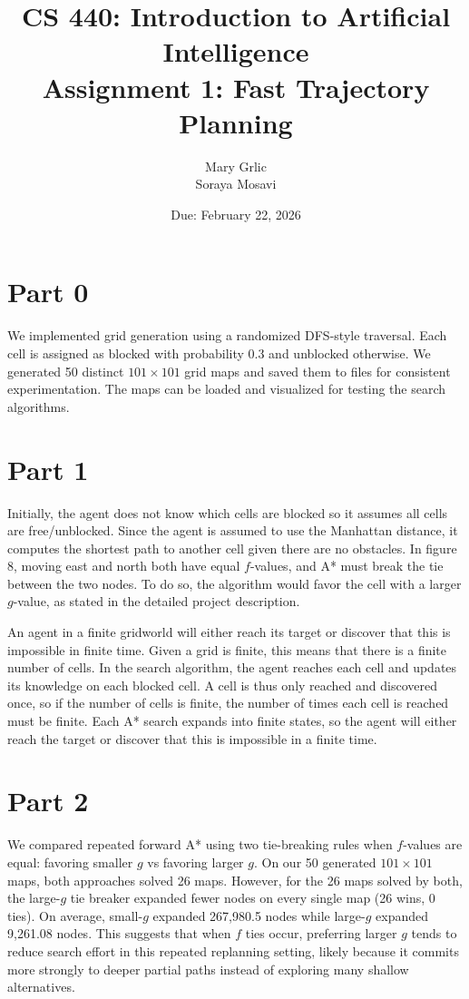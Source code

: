 \documentclass[11pt]{article}
\title{CS 440: Introduction to Artificial Intelligence\\
Assignment 1: Fast Trajectory Planning}
\author{Mary Grlic \\
Soraya Mosavi}
\date{Due: February 22, 2026}
\begin{document}
\maketitle
\newpage

\section*{Part 0}

We implemented grid generation using a randomized DFS-style traversal. Each cell is assigned as blocked with probability 0.3 and unblocked otherwise. We generated 50 distinct $101 \times 101$ grid maps and saved them to files for consistent experimentation. The maps can be loaded and visualized for testing the search algorithms.

\section*{Part 1}

Initially, the agent does not know which cells are blocked so it assumes all cells are free/unblocked. Since the agent is assumed to use the Manhattan distance, it computes the shortest path to another cell given there are no obstacles. In figure 8, moving east and north both have equal $f$-values, and A* must break the tie between the two nodes. To do so, the algorithm would favor the cell with a larger $g$-value, as stated in the detailed project description.

An agent in a finite gridworld will either reach its target or discover that this is impossible in finite time. Given a grid is finite, this means that there is a finite number of cells. In the search algorithm, the agent reaches each cell and updates its knowledge on each blocked cell. A cell is thus only reached and discovered once, so if the number of cells is finite, the number of times each cell is reached must be finite. Each A* search expands into finite states, so the agent will either reach the target or discover that this is impossible in a finite time.

\section*{Part 2}

We compared repeated forward A* using two tie-breaking rules when $f$-values are equal: favoring smaller $g$ vs favoring larger $g$. On our 50 generated $101 \times 101$ maps, both approaches solved 26 maps. However, for the 26 maps solved by both, the large-$g$ tie breaker expanded fewer nodes on every single map (26 wins, 0 ties). On average, small-$g$ expanded 267,980.5 nodes while large-$g$ expanded 9,261.08 nodes. This suggests that when $f$ ties occur, preferring larger $g$ tends to reduce search effort in this repeated replanning setting, likely because it commits more strongly to deeper partial paths instead of exploring many shallow alternatives.
\end{document}
